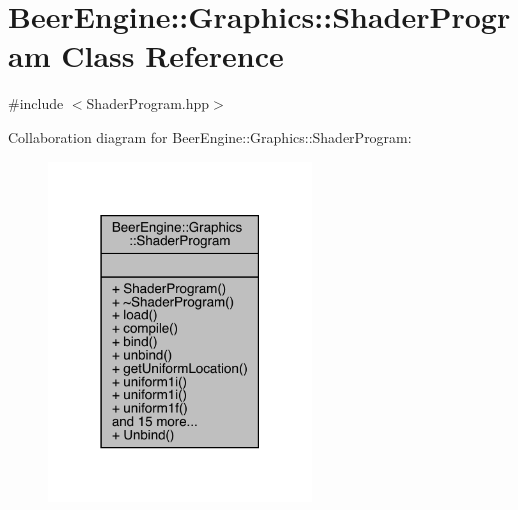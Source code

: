 \hypertarget{class_beer_engine_1_1_graphics_1_1_shader_program}{}\section{Beer\+Engine\+:\+:Graphics\+:\+:Shader\+Program Class Reference}
\label{class_beer_engine_1_1_graphics_1_1_shader_program}


{\ttfamily \#include $<$Shader\+Program.\+hpp$>$}



Collaboration diagram for Beer\+Engine\+:\+:Graphics\+:\+:Shader\+Program\+:\nopagebreak
\begin{figure}[H]
\begin{center}
\leavevmode
\includegraphics[width=198pt]{class_beer_engine_1_1_graphics_1_1_shader_program__coll__graph}
\end{center}
\end{figure}
